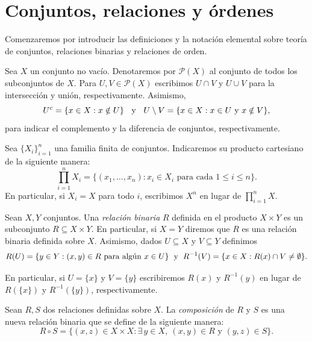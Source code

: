 \documentclass[12pt]{book}
\begin{document}
\section{Conjuntos, relaciones y órdenes}

Comenzaremos por introducir las definiciones y la notación elemental sobre teoría de conjuntos, relaciones binarias y relaciones de orden.

\vspace{0.2cm}

Sea \( X \) un conjunto no vacío. Denotaremos por \( \mathcal{P}(X) \) 
al conjunto de todos los subconjuntos de \( X \). Para \( U,V \in \mathcal{P}(X) \) escribimos \( U \cap V \) y \( U \cup V \) para la intersección y unión, respectivamente. Asimismo, 
\[
U^{c} = \{ x \in X : x \notin U \} \hspace{0.2cm} \text{ y } \hspace{0.2cm}
U \setminus V = \{ x \in X : x \in U \text{ y } x \notin V \},
\]
para indicar el complemento y la diferencia de conjuntos, respectivamente.

\vspace{0.2cm}

Sea \( \{X_i\}_{i=1}^{n} \) una familia finita de conjuntos. Indicaremos su producto cartesiano de la siguiente manera:
\[
\prod_{i=1}^{n} X_i = \{ (x_1,\dots,x_n) : x_i \in X_i \text{ para cada } 1 \le i \le n \}.
\]
En particular, si \( X_i = X \) para todo \( i \), escribimos \( X^n \) en lugar de
\( \prod_{i=1}^{n} X \).

\vspace{0.2cm}

Sean \( X,Y \) conjuntos. Una \emph{relación binaria} \( R \) definida en el producto \( X \times Y \) es un subconjunto \( R \subseteq X \times Y \). En particular, si \( X = Y \) diremos que \( R \) es una relación binaria definida sobre \( X \).
Asimismo,  dados  \( U \subseteq X \) y \( V \subseteq Y \) definimos
\[
R(U) = \{ y \in Y : (x,y) \in R \text{ para algún } x \in U \} \hspace{0.1cm} \text{ y } \hspace{0.1cm}
R^{-1}(V) = \{ x \in X : R(x) \cap V \neq \emptyset \}.
\]

En particular, si $U = \{x\}$ y $V= \{y\}$ escribiremos $R(x)$ y $R^{-1}(y)$  en lugar de $R(\{x\})$ y $R^{-1}(\{y\})$, respectivamente. 
\vspace{0.2cm}

Sean $R,S$ dos relaciones definidas sobre $X$. La \emph{composición} de $R$ y $S$ es una nueva relación binaria que se define de la siguiente manera:
\[
R \circ S = \{ (x,z) \in X \times X : \exists\, y \in X,\ (x,y) \in R \text{ y } (y,z) \in S \}.
\]
\end{document}
